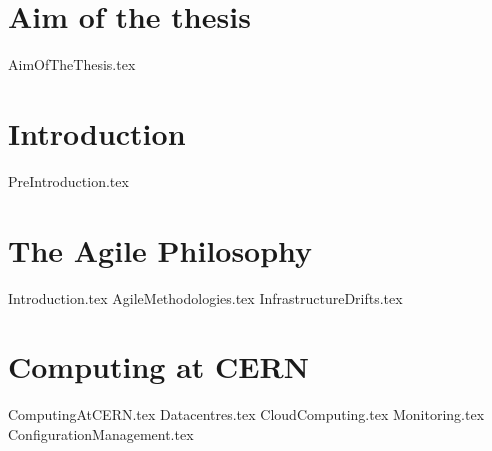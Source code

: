 \documentclass[12pt,a4paper,openright]{report}
\begin{document}

\chapter*{Aim of the thesis}

{AimOfTheThesis.tex}

\tableofcontents
\clearpage{\pagestyle{empty}\cleardoublepage}




\chapter{Introduction}

\fancyfoot{}
\fancyhead[RO,L]{\thepage}
\fancyhead[LO]{\leftmark}
\fancyhead[R]{\rightmark}


{PreIntroduction.tex}

\chapter{The Agile Philosophy}

{Introduction.tex}
{AgileMethodologies.tex}
{InfrastructureDrifts.tex}

\chapter{Computing at CERN}

{ComputingAtCERN.tex}
{Datacentres.tex}
{CloudComputing.tex}
{Monitoring.tex}
{ConfigurationManagement.tex}
\end{document}
